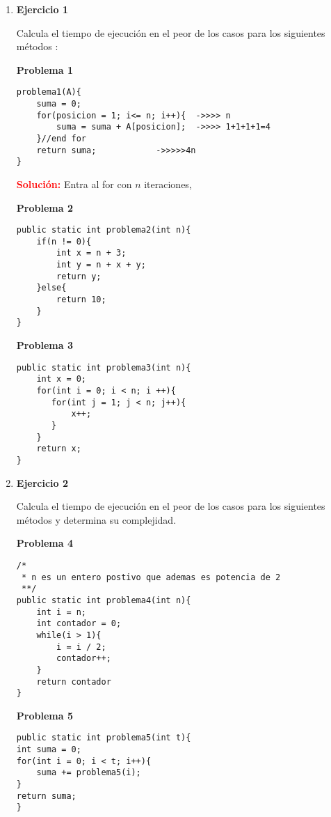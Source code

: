 \documentclass[a4paper,10pt]{article}
\begin{document}
\begin{enumerate}
    \item \textbf{Ejercicio 1}
    
     Calcula el tiempo de ejecución en el peor de los casos para los siguientes  métodos :
            
    \textbf{Problema 1}
    \begin{lstlisting}[frame = single] 
problema1(A){
    suma = 0;
    for(posicion = 1; i<= n; i++){  ->>>> n
        suma = suma + A[posicion];  ->>>> 1+1+1+1=4 
    }//end for
    return suma;            ->>>>>4n
}
\end{lstlisting}

    \textbf{\textcolor{red}{Solución:}} Entra al for con $n$ iteraciones,
   
    \textbf{Problema 2}
    \begin{lstlisting}[frame = single]
public static int problema2(int n){
    if(n != 0){
        int x = n + 3;
        int y = n + x + y;
        return y;
    }else{
        return 10;
    }
}
\end{lstlisting}

    \textbf{Problema 3}
    \begin{lstlisting}[frame = single]
public static int problema3(int n){
    int x = 0;
    for(int i = 0; i < n; i ++){
       for(int j = 1; j < n; j++){
           x++;
       }
    }
    return x;
}
\end{lstlisting}


    \item \textbf{Ejercicio 2}

    Calcula el tiempo de ejecución en el peor de los casos para los siguientes métodos y determina su complejidad.  

    \textbf{Problema 4}
    \begin{lstlisting}[frame = single]
/*
 * n es un entero postivo que ademas es potencia de 2
 **/
public static int problema4(int n){
    int i = n;
    int contador = 0;
    while(i > 1){
        i = i / 2;
        contador++;
    }
    return contador
}
\end{lstlisting}

\newpage

 \textbf{Problema 5}
\begin{lstlisting}[frame = single]
public static int problema5(int t){
int suma = 0;
for(int i = 0; i < t; i++){
    suma += problema5(i);
}
return suma;
}
\end{lstlisting}


\end{enumerate}
\end{document}
